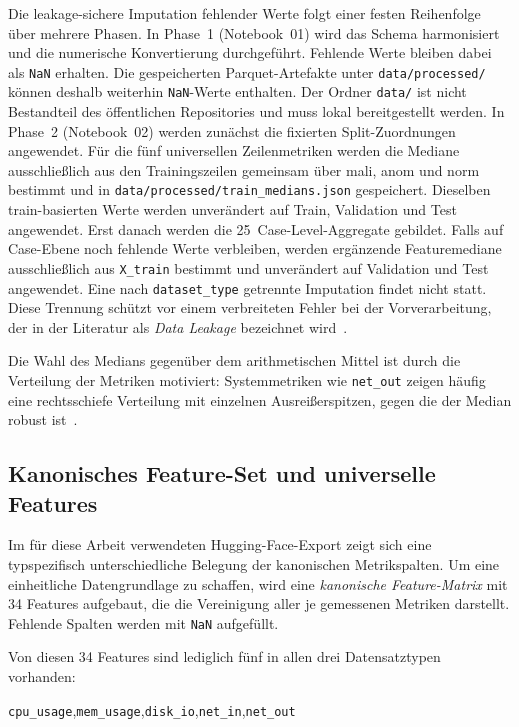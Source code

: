 Die leakage-sichere Imputation fehlender Werte folgt einer festen Reihenfolge über mehrere Phasen. In Phase~1 (Notebook~01) wird das Schema harmonisiert und die numerische Konvertierung durchgeführt. Fehlende Werte bleiben dabei als \texttt{NaN} erhalten. Die gespeicherten Parquet-Artefakte unter \texttt{data/processed/} können deshalb weiterhin \texttt{NaN}-Werte enthalten. Der Ordner \texttt{data/} ist nicht Bestandteil des öffentlichen Repositories und muss lokal bereitgestellt werden. In Phase~2 (Notebook~02) werden zunächst die fixierten Split-Zuordnungen angewendet. Für die fünf universellen Zeilenmetriken werden die Mediane ausschließlich aus den Trainingszeilen gemeinsam über mali, anom und norm bestimmt und in \texttt{data/processed/train\_medians.json} gespeichert. Dieselben train-basierten Werte werden unverändert auf Train, Validation und Test angewendet. Erst danach werden die 25~Case-Level-Aggregate gebildet. Falls auf Case-Ebene noch fehlende Werte verbleiben, werden ergänzende Featuremediane ausschließlich aus \texttt{X\_train} bestimmt und unverändert auf Validation und Test angewendet. Eine nach \texttt{dataset\_type} getrennte Imputation findet nicht statt. Diese Trennung schützt vor einem verbreiteten Fehler bei der Vorverarbeitung, der in der Literatur als \emph{Data Leakage} bezeichnet wird~\cite{kaufman2012leakage}.

Die Wahl des Medians gegenüber dem arithmetischen Mittel ist durch die Verteilung der Metriken motiviert: Systemmetriken wie \texttt{net\_out} zeigen häufig eine rechtsschiefe Verteilung mit einzelnen Ausreißerspitzen, gegen die der Median robust ist~\cite{huber2009robust}.

\subsection{Kanonisches Feature-Set und universelle Features}
\label{sec:features}

Im für diese Arbeit verwendeten Hugging-Face-Export zeigt sich eine
typspezifisch unterschiedliche Belegung der kanonischen Metrikspalten. Um eine einheitliche Datengrundlage zu schaffen, wird eine \emph{kanonische Feature-Matrix} mit 34 Features aufgebaut, die die Vereinigung aller je gemessenen Metriken darstellt. Fehlende Spalten werden mit \texttt{NaN} aufgefüllt.

Von diesen 34 Features sind lediglich fünf in allen drei Datensatztypen vorhanden:

\begin{center}
\texttt{cpu\_usage},\quad \texttt{mem\_usage},\quad \texttt{disk\_io},\quad \texttt{net\_in},\quad \texttt{net\_out}
\end{center}

